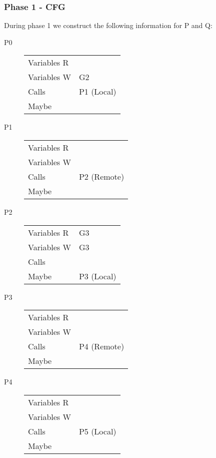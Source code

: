 \documentclass{article}
\begin{document}
\subsubsection{Phase 1 - CFG}
During phase 1 we construct the following information for P and Q:

\begin{multicols}{2}

\begin{description}
\item[P0]
  \begin{tabular}{ll}
    Variables R & \\
    Variables W & G2 \\
    Calls       & P1 (Local) \\
    Maybe       & \\
  \end{tabular}

\item[P1]
  \begin{tabular}{ll}
    Variables R & \\
    Variables W & \\
    Calls       & P2 (Remote) \\
    Maybe       & \\
  \end{tabular}

\item[P2]
  \begin{tabular}{ll}
    Variables R & G3 \\
    Variables W & G3 \\
    Calls       & \\
    Maybe       & P3 (Local) \\
  \end{tabular}

\item[P3]
  \begin{tabular}{ll}
    Variables R & \\
    Variables W & \\
    Calls       & P4 (Remote) \\
    Maybe       & \\
  \end{tabular}

\item[P4]
  \begin{tabular}{ll}
    Variables R & \\
    Variables W & \\
    Calls       & P5 (Local) \\
    Maybe       & \\
  \end{tabular}


\end{description}
\end{multicols}
\end{document}
